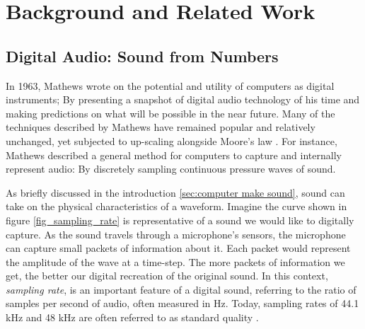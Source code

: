 \documentclass[\main/thesis.tex]{subfiles}
\begin{document}
\chapter{Background and Related Work}
\section{Digital Audio: Sound from Numbers}

In 1963, Mathews \cite{mathews1963digital} wrote on the potential and utility of computers as digital instruments; By presenting a snapshot of digital audio technology of his time and making predictions on what will be possible in the near future. Many of the techniques described by Mathews have remained popular and relatively unchanged, yet subjected to up-scaling alongside Moore's law \cite{mack2011fifty,smith1991viewpoints}. For instance, Mathews described a general method for computers to capture and internally represent audio: By discretely sampling continuous pressure waves of sound. 

As briefly discussed in the introduction \ref{sec:computer make sound}, sound can take on the physical characteristics of a waveform. Imagine the curve shown in figure \ref{fig_sampling_rate} is representative of a sound we would like to digitally capture. As the sound travels through a microphone's sensors, the microphone can capture small packets of information about it. Each packet would represent the amplitude of the wave at a time-step. The more packets of information we get, the better our digital recreation of the original sound. In this context, \textit{sampling rate}, is an important feature of a digital sound, referring to the ratio of samples per second of audio, often measured in Hz. Today, sampling rates of 44.1 kHz and 48 kHz are often referred to as standard quality \cite{reiss2016meta}. 
\end{document}

